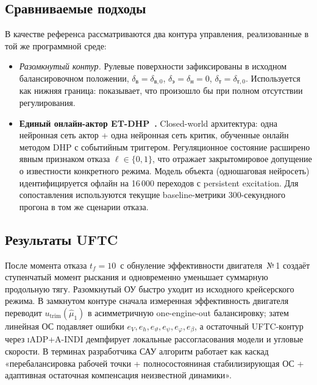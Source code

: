 \documentclass[a4paper,14pt]{extarticle}
\newcommand{\UFTC}{\textsc{UFTC}}
\newcommand{\ET}{\textsc{ET-DHP}}
\newcommand{\IADP}{\textsc{iADP}}
\newcommand{\AINDI}{\textsc{A-INDI}}
\newcommand{\dv}{\delta_{\text{в}}}
\newcommand{\dn}{\delta_{\text{н}}}
\newcommand{\de}{\delta_{\text{э}}}
\newcommand{\dt}{\delta_{\text{т}}}
\begin{document}
\subsection{Сравниваемые подходы}

В качестве референса рассматриваются два контура управления, реализованные в той же программной среде:

\begin{itemize}
\item \emph{Разомкнутый контур.} Рулевые поверхности зафиксированы в исходном балансировочном положении, $\dv = \delta_{\text{в},0}$, $\de = \dn = 0$, $\dt = \delta_{\text{т},0}$. Используется как нижняя граница: показывает, что произошло бы при полном отсутствии регулирования.

\item \textbf{Единый онлайн-актор \ET{}~\cite{mazaev2026etdhp}.} Closed-world архитектура: одна нейронная сеть актор + одна нейронная сеть критик, обученные онлайн методом DHP с событийным триггером. Регуляционное состояние расширено явным признаком отказа $\ell\in\{0,1\}$, что отражает закрытомировое допущение о известности конкретного режима. Модель объекта (одношаговая нейросеть) идентифицируется офлайн на 16\,000 переходов с persistent excitation. Для сопоставления используются текущие baseline-метрики 300-секундного прогона в том же сценарии отказа.
\end{itemize}

\subsection{Результаты UFTC}

После момента отказа $t_f=10$~с обнуление эффективности двигателя~№\,1 создаёт ступенчатый момент рыскания и одновременно уменьшает суммарную продольную тягу. Разомкнутый ОУ быстро уходит из исходного крейсерского режима. В замкнутом контуре сначала измеренная эффективность двигателя переводит $u_{\text{trim}}(\hat\mu_1)$ в асимметричную one-engine-out балансировку; затем линейная ОС подавляет ошибки $e_V,e_h,e_{\vartheta},e_{\psi},e_{\varphi},e_{\beta}$, а остаточный \UFTC{}-контур через \IADP{}+\AINDI{} демпфирует локальные рассогласования модели и угловые скорости. В терминах разработчика САУ алгоритм работает как каскад «перебалансировка рабочей точки + полносостояниная стабилизирующая ОС + адаптивная остаточная компенсация неизвестной динамики».
\end{document}
